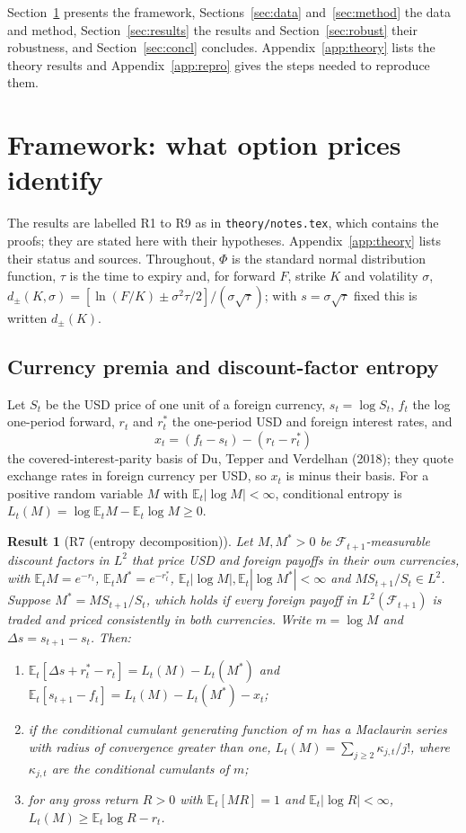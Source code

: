 \documentclass[11pt]{article}
\theoremstyle{result}
\newtheorem*{result}{Result}
\newcommand{\E}{\mathbb{E}}
\newcommand{\D}{\Delta}
\begin{document}
Section~\ref{sec:framework} presents the framework, Sections~\ref{sec:data} and~\ref{sec:method} the data and method, Section~\ref{sec:results} the results and Section~\ref{sec:robust} their robustness, and Section~\ref{sec:concl} concludes. Appendix~\ref{app:theory} lists the theory results and Appendix~\ref{app:repro} gives the steps needed to reproduce them.

\section{Framework: what option prices identify}\label{sec:framework}

The results are labelled R1 to R9 as in \texttt{theory/notes.tex}, which contains the proofs; they are stated here with their hypotheses. Appendix~\ref{app:theory} lists their status and sources. Throughout, $\Phi$ is the standard normal distribution function, $\tau$ is the time to expiry and, for forward $F$, strike $K$ and volatility $\sigma$, $d_\pm(K,\sigma)=[\ln(F/K)\pm\sigma^2\tau/2]/(\sigma\sqrt\tau)$; with $s=\sigma\sqrt\tau$ fixed this is written $d_\pm(K)$.

\subsection{Currency premia and discount-factor entropy}

Let $S_t$ be the USD price of one unit of a foreign currency, $s_t=\log S_t$, $f_t$ the log one-period forward, $r_t$ and $r^*_t$ the one-period USD and foreign interest rates, and
\[
x_t=(f_t-s_t)-(r_t-r^*_t)
\]
the covered-interest-parity basis of Du, Tepper and Verdelhan (2018); they quote exchange rates in foreign currency per USD, so $x_t$ is minus their basis. For a positive random variable $M$ with $\E_t|\log M|<\infty$, conditional entropy is $L_t(M)=\log\E_tM-\E_t\log M\ge0$.

\begin{result}[R7 (entropy decomposition)]
Let $M,M^*>0$ be $\mathcal F_{t+1}$-measurable discount factors in $L^2$ that price USD and foreign payoffs in their own currencies, with $\E_tM=e^{-r_t}$, $\E_tM^*=e^{-r^*_t}$, $\E_t|\log M|,\E_t|\log M^*|<\infty$ and $MS_{t+1}/S_t\in L^2$. Suppose $M^*=MS_{t+1}/S_t$, which holds if every foreign payoff in $L^2(\mathcal F_{t+1})$ is traded and priced consistently in both currencies. Write $m=\log M$ and $\D s=s_{t+1}-s_t$. Then:
\begin{enumerate}
\item[(i)] $\E_t[\D s+r^*_t-r_t]=L_t(M)-L_t(M^*)$ and $\E_t[s_{t+1}-f_t]=L_t(M)-L_t(M^*)-x_t$;
\item[(ii)] if the conditional cumulant generating function of $m$ has a Maclaurin series with radius of convergence greater than one, $L_t(M)=\sum_{j\ge2}\kappa_{j,t}/j!$, where $\kappa_{j,t}$ are the conditional cumulants of $m$;
\item[(iii)] for any gross return $R>0$ with $\E_t[MR]=1$ and $\E_t|\log R|<\infty$, $L_t(M)\ge\E_t\log R-r_t$.
\end{enumerate}
\end{result}
\end{document}
